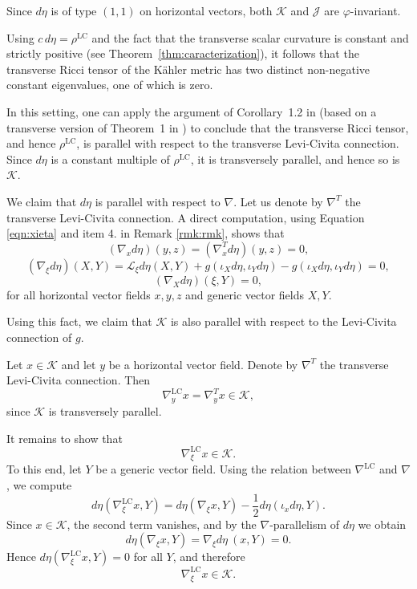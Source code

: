 \documentclass{article}
\makeatletter
\renewenvironment{proof}[1][\proofname]{%
  \par\pushQED{\qed}%
  \normalfont\topsep6\p@\@plus6\p@\relax
  \trivlist
  \item[\hskip\labelsep
        \textbf{\textup{#1}}\@addpunct{.}]\ignorespaces
}{%
  \popQED\endtrivlist\@endpefalse
}
\theoremstyle{definition}
\renewcommand{\phi}{\varphi}
\numberwithin{equation}{section}
\makeatother
\begin{document}
\begin{proof}
Since $d\eta$ is of type $(1,1)$ on horizontal vectors, both $\mathcal{K}$ and $\mathcal{J}$ are $\phi$-invariant.

Using $c\, d\eta = \rho^{\mathrm{LC}}$ and the fact that the transverse scalar curvature is constant and strictly positive (see Theorem~\ref{thm:caracterization}), it follows that the transverse Ricci tensor of the K\"ahler metric has two distinct non-negative constant eigenvalues, one of which is zero.
\medskip

In this setting, one can apply the argument of Corollary~1.2 in \cite{ABLS} (based on a transverse version of Theorem~1 in \cite{ADM}) to conclude that the transverse Ricci tensor, and hence $\rho^{\mathrm{LC}}$, is parallel with respect to the transverse Levi-Civita connection. Since $d\eta$ is a constant multiple of $\rho^{\mathrm{LC}}$, it is transversely parallel, and hence so is $\mathcal{K}$.

\medskip

We claim that $d\eta$ is parallel with respect to $\nabla$. Let us denote by $\nabla^T$ the transverse Levi-Civita connection. A direct computation, using Equation \eqref{eqn:xieta} and item 4. in Remark \ref{rmk:rmk}, shows that
\[
(\nabla_x d\eta)(y,z) = (\nabla^T_x d\eta)(y,z) = 0,
\]
\[
(\nabla_\xi d\eta)(X,Y) = \mathcal{L}_\xi d\eta (X,Y) + g(\iota_X d\eta, \iota_Y d\eta) - g(\iota_X d\eta, \iota_Y d\eta) = 0, 
\]
\[
(\nabla_X d\eta)(\xi,Y) = 0,
\]
for all horizontal vector fields $x,y,z$ and generic vector fields $X,Y$. 

\medskip

Using this fact, we claim that $\mathcal{K}$ is also parallel with respect to the Levi-Civita connection of $g$.

Let $x \in \mathcal{K}$ and let $y$ be a horizontal vector field. Denote by $\nabla^T$ the transverse Levi-Civita connection. Then
\[
\nabla^{\mathrm{LC}}_y x = \nabla^T_y x \in \mathcal{K},
\]
since $\mathcal{K}$ is transversely parallel.

It remains to show that
\[
\nabla^{\mathrm{LC}}_\xi x \in \mathcal{K}.
\]
To this end, let $Y$ be a generic vector field. Using the relation between $\nabla^{\mathrm{LC}}$ and $\nabla$, we compute
\[
d\eta(\nabla^{\mathrm{LC}}_\xi x, Y)
= d\eta(\nabla_\xi x, Y) - \frac{1}{2} d\eta(\iota_x d\eta, Y).
\]
Since $x \in \mathcal{K}$, the second term vanishes, and by the $\nabla$-parallelism of $d\eta$ we obtain
\[
d\eta(\nabla_\xi x, Y) = \nabla_\xi d\eta \ (x,Y) = 0.
\]
Hence $d\eta(\nabla^{\mathrm{LC}}_\xi x, Y) = 0$ for all $Y$, and therefore
\[
\nabla^{\mathrm{LC}}_\xi x \in \mathcal{K}.
\]


\end{proof}
\end{document}
